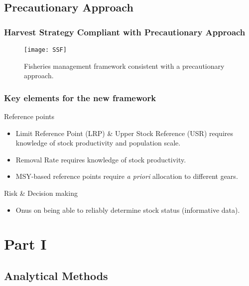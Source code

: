 \subsection{Precautionary Approach} %
\label{sub:precautionary_approach}
\begin{frame}
	\frametitle{Harvest Strategy Compliant with Precautionary Approach} 
	\begin{figure}
		[htbp] \centering 
		\texttt{[image: SSF]} \caption{Fisheries management framework consistent with a precautionary approach.} \label{fig:SSF} 
	\end{figure}
\end{frame}

%
\begin{frame}
	\frametitle{Key elements for the new framework} 
	\begin{block}
		{Reference points} 
		\begin{itemize}
			\item Limit Reference Point (LRP) \& Upper Stock Reference (USR) requires knowledge of stock productivity and population scale. 
			\item Removal Rate requires knowledge of stock productivity. 
			\item MSY-based reference points require \textit{a priori} allocation to different gears. 
		\end{itemize}
	\end{block}
	\begin{block}
		{Risk \& Decision making} 
		\begin{itemize}
			\item Onus on being able to reliably determine stock status (informative data). 
		\end{itemize}
	\end{block}
\end{frame}




\section{Part I} %
\label{sec:part_i}
%
\subsection{Analytical Methods} %
\label{sub:analytical_methods}
%
